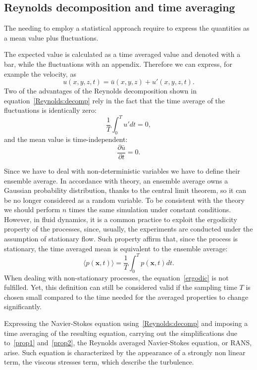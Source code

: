 
\subsection{Reynolds decomposition and time averaging}
The needing to employ a statistical approach require to express the quantities as a mean value plus fluctuations.\par
The expected value is calculated as a time averaged value and denoted with a bar, while the fluctuations with an appendix. Therefore we can express, for example the velocity, as
\begin{equation}
u(x,y,z,t) = \bar{u}(x,y,z) + u'(x,y,z,t).
\label{Reynolds:decomp}
\end{equation}
Two of the advantages of the Reynolds decomposition shown in equation~\ref{Reynolds:decomp} rely in the fact that the time average of the fluctuations is identically zero:
\begin{equation}
\frac{1}{T} \int_{0}^{T} u' dt =0,
\label{prop1}
\end{equation}
and the mean value is time-independent:
\begin{equation}
\frac{\partial \bar{u} }{\partial t} = 0.
\label{prop2}
\end{equation}
\par
Since we have to deal with non-deterministic variables we have to define their ensemble average. In accordance with theory, an ensemble average owns a Gaussian probability distribution, thanks to the central limit theorem, so it can be no longer considered as a random variable. To be consistent with the theory we should perform $n$ times the same simulation under constant conditions.
However, in fluid dynamics, it is a common practice to exploit the ergodicity property of the processes, since, usually, the experiments are conducted under the assumption of stationary flow. 
Such property affirm that, since the process is stationary, the time averaged mean is equivalent to the ensemble average:
\begin{equation}
\langle p(\mathbf{x},t) \rangle = \frac{1}{T} \int_{0}^{T} p(\mathbf{x},t) dt.
\label{ergodic}
\end{equation}
When dealing with non-stationary processes, the equation~\ref{ergodic} is not fulfilled. Yet, this definition can still be considered valid if the sampling time $T$ is chosen small compared to the time needed for the averaged properties to change significantly.
\par
Expressing the Navier-Stokes equation using~\ref{Reynolds:decomp} and imposing a time averaging of the resulting equation, carrying out the simplifications due to~\ref{prop1} and~\ref{prop2}, the Reynolds averaged Navier-Stokes equation, or RANS, arise. Such equation is characterized by the appearance of a strongly non linear term, the viscous stresses term, which describe the turbulence.
